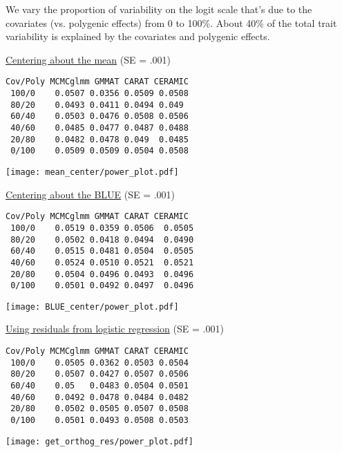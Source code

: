 \documentclass[11pt,a4paper,english]{article}
\begin{document}
We vary the proportion of variability on the logit scale that's due to the covariates (vs. polygenic effects) from 0 to 100\%. About 40\% of the total trait variability is explained by the covariates and polygenic effects.

\vspace{.25cm}
{\small
\begin{minipage}{.5\textwidth}
\underline{Centering about the mean} (SE = .001)

\begin{verbatim}
Cov/Poly MCMCglmm GMMAT CARAT CERAMIC
 100/0    0.0507 0.0356 0.0509 0.0508
 80/20    0.0493 0.0411 0.0494 0.049
 60/40    0.0503 0.0476 0.0508 0.0506
 40/60    0.0485 0.0477 0.0487 0.0488
 20/80    0.0482 0.0478 0.049  0.0485
 0/100    0.0509 0.0509 0.0504 0.0508
\end{verbatim}
\end{minipage}}
\begin{minipage}{.46\textwidth}
\texttt{[image: mean\_center/power\_plot.pdf]}
\end{minipage}


\vspace{.25cm}
{\small
\begin{minipage}{.5\textwidth}
\underline{Centering about the BLUE} (SE = .001)

\begin{verbatim}
Cov/Poly MCMCglmm GMMAT CARAT CERAMIC
 100/0    0.0519 0.0359 0.0506  0.0505
 80/20    0.0502 0.0418 0.0494  0.0490
 60/40    0.0515 0.0481 0.0504  0.0505
 40/60    0.0524 0.0510 0.0521  0.0521
 20/80    0.0504 0.0496 0.0493  0.0496
 0/100    0.0501 0.0492 0.0497  0.0496
\end{verbatim}
\end{minipage}}
\begin{minipage}{.46\textwidth}
\texttt{[image: BLUE\_center/power\_plot.pdf]}
\end{minipage}


\vspace{.25cm}
{\small
\begin{minipage}{.5\textwidth}
\underline{Using residuals from logistic regression} (SE = .001)

\begin{verbatim}
Cov/Poly MCMCglmm GMMAT CARAT CERAMIC
 100/0    0.0505 0.0362 0.0503 0.0504
 80/20    0.0507 0.0427 0.0507 0.0506
 60/40    0.05   0.0483 0.0504 0.0501
 40/60    0.0492 0.0478 0.0484 0.0482
 20/80    0.0502 0.0505 0.0507 0.0508
 0/100    0.0501 0.0493 0.0508 0.0503
\end{verbatim}
\end{minipage}}
\begin{minipage}{.46\textwidth}
\texttt{[image: get\_orthog\_res/power\_plot.pdf]}
\end{minipage}
\end{document}
